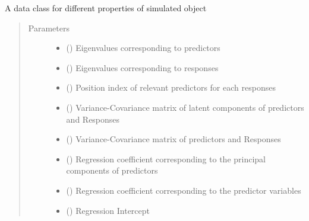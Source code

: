 \documentclass[letterpaper,10pt,english]{sphinxmanual}
\begin{document}
\begin{fulllineitems}
\label{\detokenize{Classes:pysimrel.Properties}}
A data class for different properties of simulated object
\begin{quote}\begin{description}
\item[{Parameters}] \leavevmode\begin{itemize}
\item {} 
 () \textendash{} Eigenvalues corresponding to predictors

\item {} 
 () \textendash{} Eigenvalues corresponding to responses

\item {} 
 () \textendash{} Position index of relevant predictors for each responses

\item {} 
 () \textendash{} Variance-Covariance matrix of latent components of predictors and Responses

\item {} 
 () \textendash{} Variance-Covariance matrix of predictors and Responses

\item {} 
 () \textendash{} Regression coefficient corresponding to the principal components of predictors

\item {} 
 () \textendash{} Regression coefficient corresponding to the predictor variables

\item {} 
 () \textendash{} Regression Intercept


\end{itemize}
\end{description}
\end{quote}
\end{fulllineitems}
\end{document}
